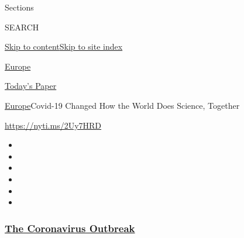 Sections

SEARCH

\protect\hyperlink{site-content}{Skip to
content}\protect\hyperlink{site-index}{Skip to site index}

\href{https://www.nytimes3xbfgragh.onion/section/world/europe}{Europe}

\href{https://myaccount.nytimes3xbfgragh.onion/auth/login?response_type=cookie\&client_id=vi}{}

\href{https://www.nytimes3xbfgragh.onion/section/todayspaper}{Today's
Paper}

\href{/section/world/europe}{Europe}\textbar{}Covid-19 Changed How the
World Does Science, Together

\url{https://nyti.ms/2Uy7HRD}

\begin{itemize}
\item
\item
\item
\item
\item
\item
\end{itemize}

\hypertarget{the-coronavirus-outbreak}{%
\subsubsection{\texorpdfstring{\href{https://www.nytimes3xbfgragh.onion/news-event/coronavirus?name=styln-coronavirus-national\&region=TOP_BANNER\&block=storyline_menu_recirc\&action=click\&pgtype=Article\&impression_id=931eace0-f2cd-11ea-bbb3-1fcabe959d46\&variant=undefined}{The
Coronavirus
Outbreak}}{The Coronavirus Outbreak}}\label{the-coronavirus-outbreak}}


